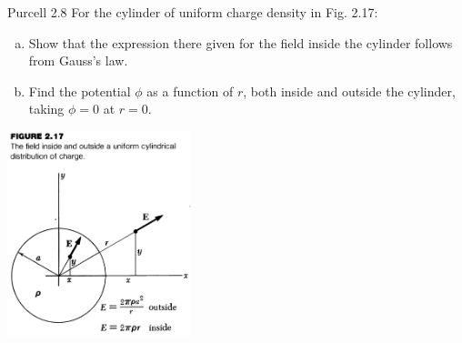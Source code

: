 \documentclass{esg8022pset}
\begin{document}
\begin{problem}{Purcell 2.8}
  For the cylinder of uniform charge density in Fig. 2.17:
  \begin{enumerate}[(a)]
    \item Show that the expression there given for the field inside the cylinder follows from Gauss's law.
    \item Find the potential $\phi$ as a function of $r$, both inside and outside the cylinder, taking $\phi = 0$ at $r = 0$. 
  \end{enumerate}
  \begin{center}\includegraphics[width=0.4\textwidth]{ps02_2}\end{center} 
\end{problem}
\end{document}
